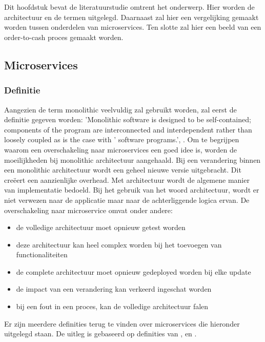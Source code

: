 \chapter{}
\label{ch:stand-van-zaken}



Dit hoofdstuk bevat de literatuurstudie omtrent het onderwerp. Hier worden de architectuur en de termen uitgelegd. Daarnaast zal hier een vergelijking gemaakt worden tussen onderdelen van microservices. Ten slotte zal hier een beeld van een order-to-cash proces gemaakt worden.

\section{Microservices}
\subsection{Definitie}
Aangezien de term monolithic veelvuldig zal gebruikt worden, zal eerst de definitie gegeven worden:  'Monolithic software is designed to be self-contained; components of the program are interconnected and interdependent rather than loosely coupled as is the case with ' software programs.',  \textcite{Wigmore2016}.
Om te begrijpen waarom een overschakeling naar microservices een goed idee is, worden de moeilijkheden bij monolithic architectuur aangehaald. Bij een verandering binnen een monolithic architectuur wordt een geheel nieuwe versie uitgebracht. Dit creëert een aanzienlijke overhead. Met architectuur wordt de algemene manier van implementatie bedoeld. Bij het gebruik van het woord architectuur, wordt er niet verwezen naar de applicatie maar naar de achterliggende logica ervan.
De overschakeling naar microservice omvat onder andere:
\begin{itemize}
	\item de volledige architectuur moet opnieuw getest worden
	\item deze architectuur kan heel complex worden bij het toevoegen van functionaliteiten
	\item de complete architectuur moet opnieuw gedeployed worden bij elke update
	\item de impact van een verandering kan verkeerd ingeschat worden
	\item bij een fout in een proces, kan de volledige architectuur falen
\end{itemize}
Er zijn meerdere definities terug te vinden over microservices die hieronder uitgelegd staan. De uitleg is gebaseerd op definities van \textcite{Mauersberger2017}, \textcite{Watts2018} en \textcite{Benetis2016a}.

